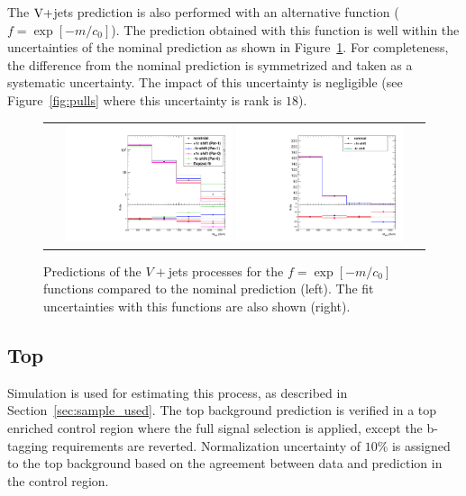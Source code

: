 The $\mathrm{V}+$jets  prediction is also performed with an alternative function ($f=\exp\left[-m/c_{0}\right]$). The prediction obtained with this function is well within the uncertainties of the nominal prediction as shown in Figure~\ref{fig:wjet2}. For completeness, the difference from the nominal prediction is symmetrized and taken as a systematic uncertainty. The impact of this uncertainty is negligible (see Figure~\ref{fig:pulls} where this uncertainty is rank is $18$).    

\begin{figure}[!htbp]
  \begin{center}
    \begin{tabular}{c}
    \includegraphics[width=0.45\textwidth]{Plots/systematic/WjetFit_all_log.pdf}%
    \includegraphics[width=0.45\textwidth]{Plots/systematic/WjetFitSyst_AlternateShape_Wjets.pdf}%
    \end{tabular}
    \caption{Predictions of the $V+$jets processes for the $f=\exp\left[-m/c_{0}\right]$ functions compared to the nominal prediction (left). The fit uncertainties with this functions are also shown (right).}
    \label{fig:wjet2}
  \end{center}
\end{figure}


\subsection{Top }
Simulation is used for estimating this process, as described in Section~\ref{sec:sample_used}. The top background prediction is verified in a top enriched control region where the full signal selection is applied, except the b-tagging requirements are reverted. Normalization uncertainty of $10\%$ is assigned to the top background based on the agreement between data and prediction in the control region. 


